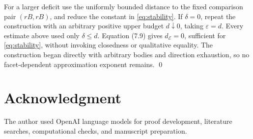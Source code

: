 \documentclass[11pt,reqno]{amsart}
\numberwithin{equation}{section}
\theoremstyle{remark}
\theoremstyle{definition}
\begin{document}
For a larger deficit use the uniformly bounded distance to the fixed comparison pair \((rB,rB)\), and reduce the constant in \eqref{eq:stability}. If \(\delta=0\), repeat the construction with an arbitrary positive upper budget \(d\downarrow0\), taking \(\varepsilon=d\). Every estimate above used only \(\delta\le d\). Equation (7.9) gives \(d_{\mathcal E}=0\), sufficient for \eqref{eq:stability}, without invoking closedness or qualitative equality. The construction began directly with arbitrary bodies and direction exhaustion, so no facet-dependent approximation exponent remains. \qed


\section*{Acknowledgment}
The author used OpenAI language models for proof development, literature
searches, computational checks, and manuscript preparation.
\end{document}
